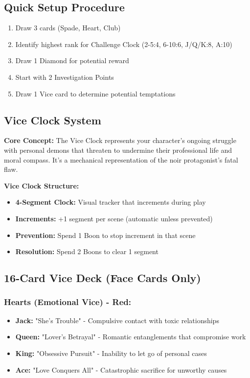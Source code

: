 \documentclass[11pt]{article}
\begin{document}
\subsection{Quick Setup Procedure}
\begin{enumerate}
    \item Draw 3 cards (Spade, Heart, Club)
    \item Identify highest rank for Challenge Clock (2-5:4, 6-10:6, J/Q/K:8, A:10)
    \item Draw 1 Diamond for potential reward
    \item Start with 2 Investigation Points
    \item Draw 1 Vice card to determine potential temptations
\end{enumerate}

\subsection{Vice Clock System}

\textbf{Core Concept:}
The Vice Clock represents your character's ongoing struggle with personal demons that threaten to undermine their professional life and moral compass. It's a mechanical representation of the noir protagonist's fatal flaw.

\textbf{Vice Clock Structure:}
\begin{itemize}
    \item \textbf{4-Segment Clock:} Visual tracker that increments during play
    \item \textbf{Increments:} +1 segment per scene (automatic unless prevented)
    \item \textbf{Prevention:} Spend 1 Boon to stop increment in that scene
    \item \textbf{Resolution:} Spend 2 Boons to clear 1 segment
\end{itemize}

\subsection{16-Card Vice Deck (Face Cards Only)}

\subsubsection{Hearts (Emotional Vice) - Red:}
\begin{itemize}
    \item \textbf{Jack:} "She's Trouble" - Compulsive contact with toxic relationships
    \item \textbf{Queen:} "Lover's Betrayal" - Romantic entanglements that compromise work
    \item \textbf{King:} "Obsessive Pursuit" - Inability to let go of personal cases
    \item \textbf{Ace:} "Love Conquers All" - Catastrophic sacrifice for unworthy causes
\end{itemize}
\end{document}
